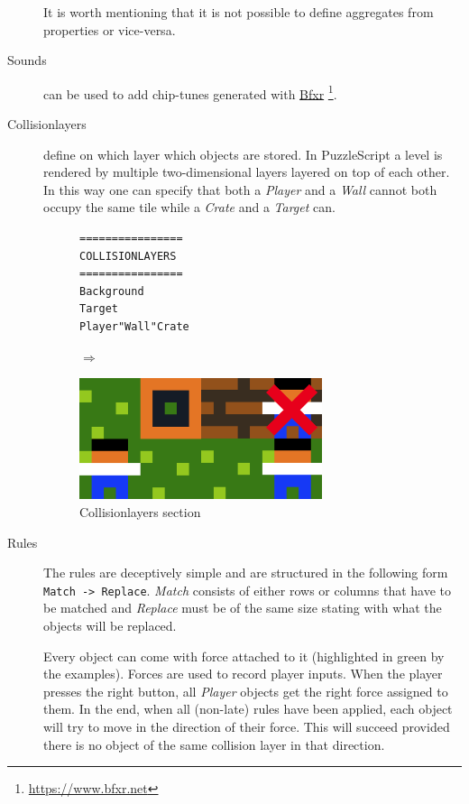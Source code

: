 \begin{description}
        It is worth mentioning that it is not possible to define aggregates from properties or vice-versa.
    
    
    \item[Sounds] can be used to add chip-tunes generated with \href{https://www.bfxr.net}{Bfxr} \footnote{\url{https://www.bfxr.net}}.
    
    \item[Collisionlayers] define on which layer which objects are stored. In PuzzleScript a level is rendered by multiple two-dimensional layers layered on top of each other.
     In this way one can specify that both a \textit{Player} and a \textit{Wall} cannot both occupy the same tile while a \textit{Crate} and a \textit{Target} can.
     
             \begin{figure}[!htbp]
    \begin{minipage}{0.4\textwidth}
        \centering
    \begin{lstlisting}
================
COLLISIONLAYERS
================
Background
Target
Player"Wall"Crate
    \end{lstlisting}
    
    \end{minipage} \qquad $\Longrightarrow$ \hfill
    \begin{minipage}{0.45\textwidth}
    \includegraphics[width=0.7\textwidth]{figures/collisionlayersboth.png}
    \end{minipage}
    \caption{Collisionlayers section}
    \end{figure}
    
    \item[Rules] The rules are deceptively simple and are structured in the following form \: \lstinline{Match -> Replace}. \textit{Match} consists of either rows or columns that have to be matched and \textit{Replace} must be of the same size stating with what the objects will be replaced.
        
    Every object can come with force attached to it (highlighted in green by the examples). Forces are used to record player inputs. When the player presses the right button, all \textit{Player} objects get the right force assigned to them. In the end, when all (non-late) rules have been applied, each object will try to move in the direction of their force. This will succeed provided there is no object of the same collision layer in that direction.
        

\end{description}
